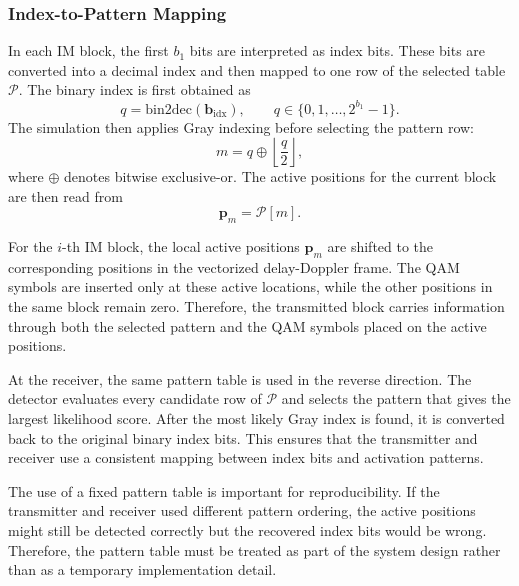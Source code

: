 \subsubsection{Index-to-Pattern Mapping}

In each IM block, the first \(b_1\) bits are interpreted as index bits. These bits are converted into a decimal index and then mapped to one row of the selected table \(\mathcal{P}\). The binary index is first obtained as
\begin{equation}
    q =
    \mathrm{bin2dec}
    \left(
    \mathbf{b}_{\mathrm{idx}}
    \right),
    \qquad
    q \in \{0,1,\ldots,2^{b_1}-1\}.
    \label{eq:index_binary_decimal}
\end{equation}
The simulation then applies Gray indexing before selecting the pattern row:
\begin{equation}
    m = q \oplus \left\lfloor \frac{q}{2} \right\rfloor ,
    \label{eq:gray_index_mapping}
\end{equation}
where \(\oplus\) denotes bitwise exclusive-or. The active positions for the current block are then read from
\begin{equation}
    \mathbf{p}_m = \mathcal{P}[m].
\end{equation}

For the \(i\)-th IM block, the local active positions \(\mathbf{p}_m\) are shifted to the corresponding positions in the vectorized delay-Doppler frame. The QAM symbols are inserted only at these active locations, while the other positions in the same block remain zero. Therefore, the transmitted block carries information through both the selected pattern and the QAM symbols placed on the active positions.

At the receiver, the same pattern table is used in the reverse direction. The detector evaluates every candidate row of \(\mathcal{P}\) and selects the pattern that gives the largest likelihood score. After the most likely Gray index is found, it is converted back to the original binary index bits. This ensures that the transmitter and receiver use a consistent mapping between index bits and activation patterns.

The use of a fixed pattern table is important for reproducibility. If the transmitter and receiver used different pattern ordering, the active positions might still be detected correctly but the recovered index bits would be wrong. Therefore, the pattern table must be treated as part of the system design rather than as a temporary implementation detail.

